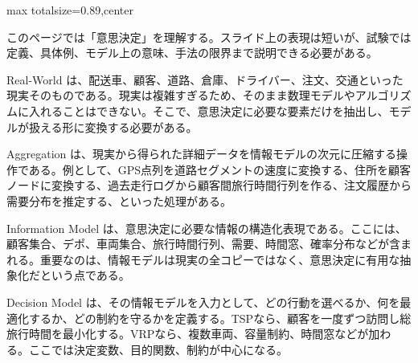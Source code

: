 \begin{minipage}[t]{0.58\textwidth}
\begin{adjustbox}{max totalsize={\textwidth}{0.89\textheight},center}
\begin{minipage}{\textwidth}\scriptsize
{}このページでは「意思決定」を理解する。スライド上の表現は短いが、試験では定義、具体例、モデル上の意味、手法の限界まで説明できる必要がある。\par
Real-World は、配送車、顧客、道路、倉庫、ドライバー、注文、交通といった現実そのものである。現実は複雑すぎるため、そのまま数理モデルやアルゴリズムに入れることはできない。そこで、意思決定に必要な要素だけを抽出し、モデルが扱える形に変換する必要がある。\par
Aggregation は、現実から得られた詳細データを情報モデルの次元に圧縮する操作である。例として、GPS点列を道路セグメントの速度に変換する、住所を顧客ノードに変換する、過去走行ログから顧客間旅行時間行列を作る、注文履歴から需要分布を推定する、といった処理がある。\par
Information Model は、意思決定に必要な情報の構造化表現である。ここには、顧客集合、デポ、車両集合、旅行時間行列、需要、時間窓、確率分布などが含まれる。重要なのは、情報モデルは現実の全コピーではなく、意思決定に有用な抽象化だという点である。\par
Decision Model は、その情報モデルを入力として、どの行動を選べるか、何を最適化するか、どの制約を守るかを定義する。TSPなら、顧客を一度ずつ訪問し総旅行時間を最小化する。VRPなら、複数車両、容量制約、時間窓などが加わる。ここでは決定変数、目的関数、制約が中心になる。\par

\end{minipage}
\end{adjustbox}
\end{minipage}
